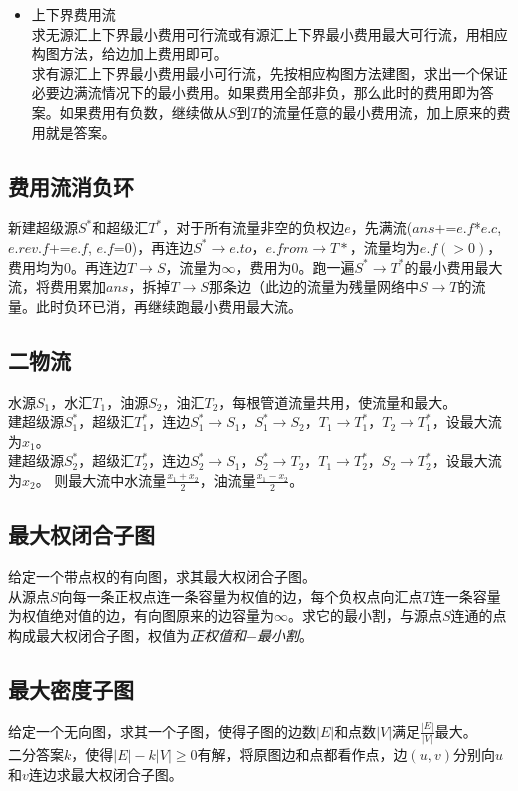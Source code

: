 \begin{itemize}[wide=0pt]
\begin{itemize}[nosep,wide=0pt]
                \end{itemize}
            \item 上下界费用流
                \\求无源汇上下界最小费用可行流或有源汇上下界最小费用最大可行流，用相应构图方法，给边加上费用即可。
                \\求有源汇上下界最小费用最小可行流，先按相应构图方法建图，求出一个保证必要边满流情况下的最小费用。如果费用全部非负，那么此时的费用即为答案。如果费用有负数，继续做从$ S $到$ T $的流量任意的最小费用流，加上原来的费用就是答案。
        \end{itemize}
    \subsection*{费用流消负环}
        新建超级源$ S^\ast $和超级汇$ T^\ast $，对于所有流量非空的负权边$ e $，先满流($ ans $+=$ e.f $*$ e.c $, $  e.rev.f $+=$ e.f $, $ e.f $=$ 0 $)，再连边$ S^\ast \to e.to $，$ e.from \to T\ast $，流量均为$ e.f (> 0) $，费用均为$ 0 $。再连边$ T \to S $，流量为$ \infty $，费用为$ 0 $。跑一遍$ S^\ast \to T^\ast $的最小费用最大流，将费用累加$ ans $，拆掉$ T \to S $那条边（此边的流量为残量网络中$ S \to T $的流量。此时负环已消，再继续跑最小费用最大流。
    \subsection*{二物流}
        水源$ S_1 $，水汇$ T_1 $，油源$ S_2 $，油汇$ T_2 $，每根管道流量共用，使流量和最大。
        \\建超级源$ S_1^\ast $，超级汇$ T_1^\ast $，连边$ S_1^\ast \to S_1 $，$ S_1^\ast \to S_2 $，$ T_1 \to T_1^\ast $，$ T_2 \to T_1^\ast $，设最大流为$ x_1 $。
        \\建超级源$ S_2^\ast $，超级汇$ T_2^\ast $，连边$ S_2^\ast \to S_1 $，$ S_2^\ast \to T_2 $，$ T_1 \to T_2^\ast $，$ S_2 \to T_2^\ast $，设最大流为$ x_2 $。
        则最大流中水流量$ \frac{x_1 + x_2}{2} $，油流量$ \frac{x_1 - x_2}{2} $。
    \subsection*{最大权闭合子图}
        给定一个带点权的有向图，求其最大权闭合子图。
        \\从源点$ S $向每一条正权点连一条容量为权值的边，每个负权点向汇点$ T $连一条容量为权值绝对值的边，有向图原来的边容量为$ \infty $。求它的最小割，与源点$ S $连通的点构成最大权闭合子图，权值为\textit{正权值和}$ - $\textit{最小割}。
    \subsection*{最大密度子图}
        给定一个无向图，求其一个子图，使得子图的边数$ \left| E \right| $和点数$ \left| V \right| $满足$ \frac{\left| E \right|}{\left| V \right|} $最大。
        \\二分答案$ k $，使得$ \left| E \right| - k \left| V \right| \geq 0 $有解，将原图边和点都看作点，边$ (u, v) $分别向$ u $和$ v $连边求最大权闭合子图。

